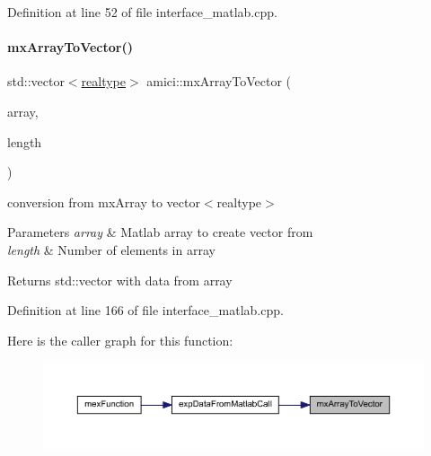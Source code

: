 Definition at line 52 of file interface\+\_\+matlab.\+cpp.

\mbox{\label{namespaceamici_af8f91dbb6a395a9907c59dd92991ec18}} 
\paragraph{\texorpdfstring{mxArrayToVector()}{mxArrayToVector()}}
{\footnotesize\ttfamily std\+::vector$<$\mbox{\hyperlink{namespaceamici_a1bdce28051d6a53868f7ccbf5f2c14a3}{realtype}}$>$ amici\+::mx\+Array\+To\+Vector (\begin{DoxyParamCaption}\item[{const mx\+Array $\ast$}]{array,  }\item[{int}]{length }\end{DoxyParamCaption})}

conversion from mx\+Array to vector$<$realtype$>$ 
\begin{DoxyParams}{Parameters}
{\em array} & Matlab array to create vector from \\
\hline
{\em length} & Number of elements in array \\
\hline
\end{DoxyParams}
\begin{DoxyReturn}{Returns}
std\+::vector with data from array 
\end{DoxyReturn}


Definition at line 166 of file interface\+\_\+matlab.\+cpp.

Here is the caller graph for this function\+:
\nopagebreak
\begin{figure}[H]
\begin{center}
\leavevmode
\includegraphics[width=350pt]{namespaceamici_af8f91dbb6a395a9907c59dd92991ec18_icgraph}
\end{center}
\end{figure}
\mbox{\label{namespaceamici_a00a3387dd5fe07628c21a763aee28036}} 
